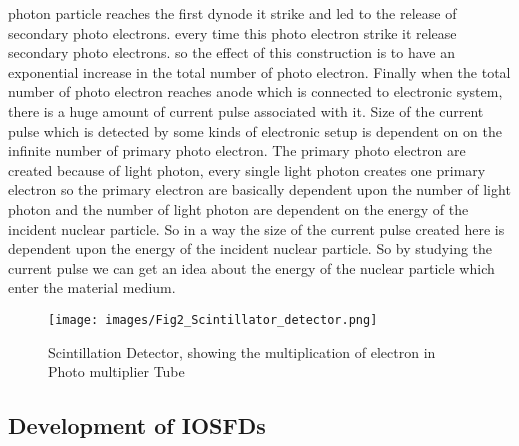 \documentclass{article}
\begin{document}
\begin{multicols}{2}
photon particle reaches the first dynode it strike and led to the release of secondary photo electrons. every time this photo electron strike it release secondary photo electrons. so the effect of this construction is to have an exponential increase in the total number of photo electron. Finally when the total number of photo electron reaches anode which is connected to electronic system, there is a huge amount of current pulse associated with it. Size of the current pulse which is detected by some kinds of electronic setup is dependent on on the infinite number of primary photo electron. The primary photo electron  are created because of light photon, every single light photon creates one primary electron so the primary electron are basically dependent upon the number of light photon and the number of light photon are dependent on the energy of the incident nuclear particle. So in a way the size of the current pulse created here is dependent upon the energy of the incident nuclear particle. So by studying the current pulse we can get an idea about the energy of the nuclear particle which enter the material medium.
\end{multicols}
\begin{figure}[H]
    \centering
    \texttt{[image: images/Fig2\_Scintillator\_detector.png]}
    \caption{Scintillation Detector, showing the multiplication of electron in Photo multiplier Tube}
    \label{fig:2}
\end{figure}

\begin{multicols}{2}
\section{Development of IOSFDs}
\end{multicols}
\end{document}
